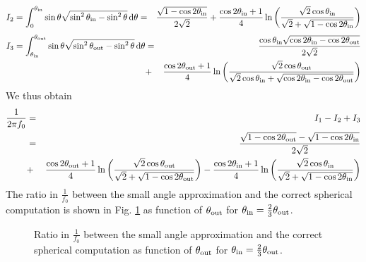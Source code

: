\documentclass{article}[12pt,a4]
\begin{document}
\begin{eqnarray}
I_2 = \int_0^{\theta_{\rm in}} \sin \theta \sqrt {\sin^2 \theta_{\rm in} - \sin^2 \theta} \, {\rm d}\theta & = 
&\frac{\sqrt{1 - \cos 2\theta_{\rm in}}}{2 \sqrt{2}} + 
\frac{\cos 2\theta_{\rm in}+1}{4} \ln 
\left( 
\frac{\sqrt{2} \cos \theta_{\rm in}}{\sqrt{2} + \sqrt{1 - \cos 2\theta_{\rm in}}} 
\right)
\end{eqnarray}
\begin{eqnarray}
I_3 = \int_{\theta_{\rm in}}^{\theta_{\rm out}} \sin \theta \sqrt {\sin^2 \theta_{\rm out} - \sin^2 \theta} \, {\rm d}\theta & = &
\frac{\cos \theta_{\rm in} \sqrt{\cos 2\theta_{\rm in} - \cos 2\theta_{\rm out}}}{2 \sqrt{2}} \nonumber \\
& + &\frac{\cos 2\theta_{\rm out}+1}{4}
\ln \left( 
\frac{\sqrt{2} \cos \theta_{\rm out}}
{ \sqrt{2} \cos \theta_{\rm in} + \sqrt{\cos 2\theta_{\rm in} - \cos 2\theta_{\rm out}} }
\right)
\end{eqnarray}
We thus obtain
\begin{eqnarray}
\frac{1}{2\pi f_0} & = & I_1 - I_2 + I_3 \nonumber \\
& = & \frac{ \sqrt{1 - \cos 2\theta_{\rm out}} - \sqrt{1 - \cos 2\theta_{\rm in}} }{ 2 \sqrt{2} } \nonumber \\
& + & \frac{\cos 2\theta_{\rm out}+1}{4} \ln \left( 
\frac{\sqrt{2} \cos \theta_{\rm out}} {\sqrt{2} + \sqrt{1 - \cos 2\theta_{\rm out}}} \right) -
\frac{\cos 2\theta_{\rm in}+1}{4} \ln \left( 
\frac{\sqrt{2} \cos \theta_{\rm in}}{\sqrt{2} + \sqrt{1 - \cos 2\theta_{\rm in}}} \right)
\end{eqnarray}
The ratio in $\frac{1}{f_0}$ between the small angle approximation and the correct spherical
computation is shown in Fig. \ref{fig:shellfunction} as function of $\theta_{\rm out}$ for
$\theta_{\rm in} = \frac{2}{3}\theta_{\rm out}$.

\begin{figure}
  \center
 \caption{Ratio in $\frac{1}{f_0}$ between the small angle approximation and the correct 
spherical computation as function of $\theta_{\rm out}$ for
$\theta_{\rm in} = \frac{2}{3}\theta_{\rm out}$.}
 \label{fig:shellfunction}
\end{figure}




\end{document}
